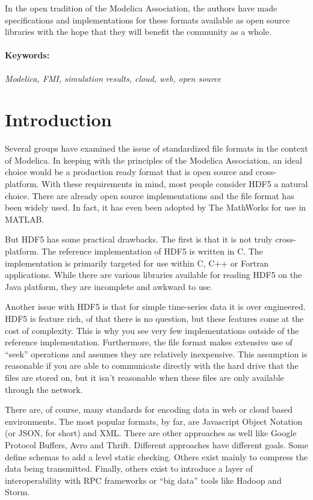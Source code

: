 \documentclass[11pt,a4paper,twocolumn]{article}
\begin{document}
In the open tradition of the Modelica Association, the authors have
made specifications and implementations for these formats available as
open source libraries with the hope that they will benefit the
community as a whole.

\paragraph{Keywords:}\emph{Modelica, FMI, simulation results,
  cloud, web, open source}

\section{Introduction}
\label{sec:intro}

Several groups have examined the issue of standardized file formats
\cite{AndreasHDF5,GallHDF5} in the context of Modelica.  In keeping
with the principles of the Modelica Association, an ideal choice would
be a production ready format that is open source and cross-platform.
With these requirements in mind, most people consider HDF5 a natural
choice.  There are already open source implementations and the file
format has been widely used.  In fact, it has even been adopted by The
MathWorks for use in MATLAB.

But HDF5 has some practical drawbacks.  The first is that it is not
truly cross-platform.  The reference implementation of HDF5 is written
in C.  The implementation is primarily targeted for use within C, C++
or Fortran applications.  While there are various libraries available
for reading HDF5 on the Java platform\cite{HDFJava}, they are
incomplete and awkward to use.

Another issue with HDF5 is that for simple time-series data it is over
engineered.  HDF5 is feature rich, of that there is no question, but
these features come at the cost of complexity.  This is why you see
very few implementations outside of the reference implementation.
Furthermore, the file format makes extensive use of ``seek''
operations and assumes they are relatively inexpensive.  This
assumption is reasonable if you are able to communicate directly with
the hard drive that the files are stored on, but it isn't reasonable
when these files are only available through the network.

There are, of course, many standards for encoding data in web or cloud
based environments.  The most popular formats, by far, are Javascript
Object Notation (or JSON, for short) and XML.  There are other
approaches as well like Google Protocol Buffers\cite{GPB},
Avro\cite{Avro} and Thrift\cite{Thrift}.  Different approaches have
different goals.  Some define schemas to add a level static checking.
Others exist mainly to compress the data being transmitted.  Finally,
others exist to introduce a layer of interoperability with RPC
frameworks or ``big data'' tools like Hadoop\cite{Hadoop} and
Storm\cite{Storm}.
\end{document}
